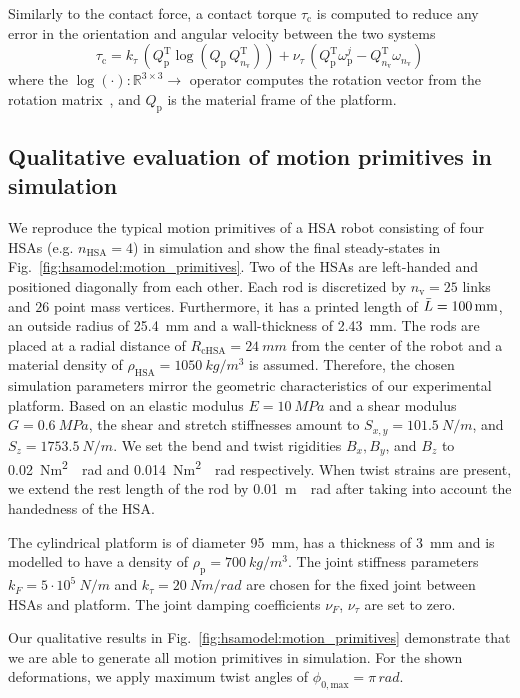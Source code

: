 Similarly to the contact force, a contact torque $\tau_\mathrm{c}$ is computed to reduce any error in the orientation and angular velocity between the two systems
\begin{equation}
    \tau_\mathrm{c} = k_\tau \, (Q_\mathrm{p}^\mathrm{T} \log(Q_\mathrm{p} \, Q_{n_\mathrm{v}}^\mathrm{T})) + \nu_\tau \, (Q_\mathrm{p}^\mathrm{T} \omega_\mathrm{p}^j - Q_{n_\mathrm{v}}^\mathrm{T} \omega_{n_\mathrm{v}})
\end{equation}
where the $\log(\cdot): \mathbb{R}^{3 \times 3} \rightarrow $ operator computes the rotation vector from the rotation matrix~\cite{gazzola2018forward}, and $Q_\mathrm{p}$ is the material frame of the platform.

\subsection{Qualitative evaluation of motion primitives in simulation}\label{sub:hsamodel:hsa_robot_simulation:motion_primitives}
We reproduce the typical motion primitives of a \gls{HSA} robot consisting of four \glspl{HSA} (e.g. $n_\mathrm{HSA} = 4$) in simulation and show the final steady-states in Fig.~\ref{fig:hsamodel:motion_primitives}. Two of the \glspl{HSA} are left-handed and positioned diagonally from each other. 
Each rod is discretized by $n_\mathrm{v} = 25$ links and $26$ point mass vertices. Furthermore, it has a printed length of $\Bar{L} = \SI{100}{mm}$, an outside radius of \SI{25.4}{mm} and a wall-thickness of \SI{2.43}{mm}. The rods are placed at a radial distance of $R_\mathrm{cHSA} = \SI{24}{mm}$ from the center of the robot and a material density of $\rho_\mathrm{HSA} = \SI{1050}{kg \per m^3}$ is assumed. Therefore, the chosen simulation parameters mirror the geometric characteristics of our experimental platform.
Based on an elastic modulus $E=\SI{10}{MPa}$ and a shear modulus $G=\SI{0.6}{MPa}$, the shear and stretch stiffnesses amount to $S_{x,y} = \SI{101.5}{N \per m}$, and $S_z = \SI{1753.5}{N \per m}$.
We set the bend and twist rigidities $B_{x}, B_y$, and $B_z$ to \SI{0.02}{Nm^2 \per rad} and \SI{0.014}{Nm^2 \per rad} respectively. When twist strains are present, we extend the rest length of the rod by \SI{0.01}{m \per rad} after taking into account the handedness of the \gls{HSA}.

The cylindrical platform is of diameter \SI{95}{mm}, has a thickness of \SI{3}{mm} and is modelled to have a density of $\rho_\mathrm{p} = \SI{700}{kg / m^3}$.
The joint stiffness parameters $k_F = 5\cdot 10^5 \: \si{N \per m}$ and $k_\tau = 20 \: \si{Nm \per rad}$ are chosen for the fixed joint between \glspl{HSA} and platform. The joint damping coefficients $\nu_F$, $\nu_\tau$ are set to zero.

Our qualitative results in Fig.~\ref{fig:hsamodel:motion_primitives} demonstrate that we are able to generate all motion primitives in simulation. For the shown deformations, we apply maximum twist angles of $\phi_{0,\mathrm{max}} = \pi \, \si{rad}$. %